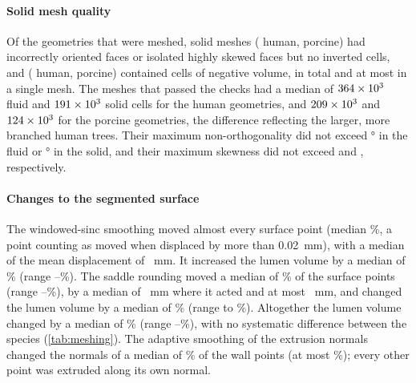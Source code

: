 \paragraph{Solid mesh quality}
Of the \MeshMeshedAll{} geometries that were meshed, \MeshOrientationAll{} solid meshes (\MeshOrientationHuman{} human, \MeshOrientationPorcine{} porcine) had incorrectly oriented faces or isolated highly skewed faces but no inverted cells, and \MeshNegativeAll{} (\MeshNegativeHuman{} human, \MeshNegativePorcine{} porcine) contained cells of negative volume, \MeshNegativeCellsTotal{} in total and at most \MeshNegativeCellsMax{} in a single mesh.
The meshes that passed the checks had a median of $364\times10^{3}$ fluid and $191\times10^{3}$ solid cells for the human geometries, and $209\times10^{3}$ and $124\times10^{3}$ for the porcine geometries, the difference reflecting the larger, more branched human trees.
Their maximum non-orthogonality did not exceed \FluidNonOrthoMaxAll\si{\degree} in the fluid or \SolidNonOrthoMaxAll\si{\degree} in the solid, and their maximum skewness did not exceed \FluidSkewMaxAll{} and \SolidSkewMaxAll{}, respectively.

\paragraph{Changes to the segmented surface}
The windowed-sinc smoothing moved almost every surface point (median \TaubinMovedMedianAll\%, a point counting as moved when displaced by more than \SI{0.02}{\milli\metre}), with a median of the mean displacement of \TaubinDispMedianAll~mm.
It increased the lumen volume by a median of \VolTaubinMedianAll\% (range \VolTaubinMinAll--\VolTaubinMaxAll\%).
The saddle rounding moved a median of \SaddleMovedMedianAll\% of the surface points (range \SaddleMovedMinAll--\SaddleMovedMaxAll\%), by a median of \SaddleDispMedianAll~mm where it acted and at most \SaddleDispMaxAll~mm, and changed the lumen volume by a median of \VolSaddleMedianAll\% (range \VolSaddleMinAll{} to \VolSaddleMaxAll\%).
Altogether the lumen volume changed by a median of \VolTotalMedianAll\% (range \VolTotalMinAll--\VolTotalMaxAll\%), with no systematic difference between the species (\cref{tab:meshing}).
The adaptive smoothing of the extrusion normals changed the normals of a median of \NormalSmoothedMedianAll\% of the wall points (at most \NormalSmoothedMaxAll\%); every other point was extruded along its own normal.

